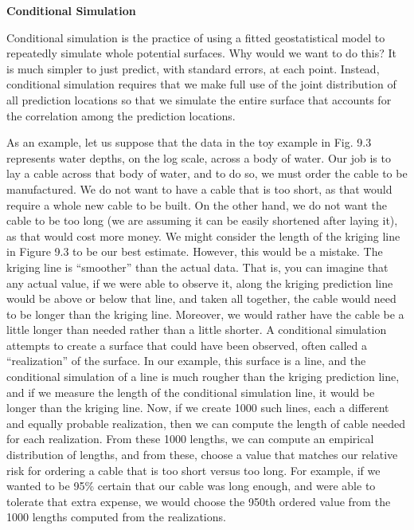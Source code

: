 \documentclass[12pt, titlepage]{article}
\begin{document}
\setcounter{equation}{0}
\renewcommand{\theequation}{R.\arabic{equation}}


%
%

{\large \flushleft \textbf{Conditional Simulation}}

\vspace{.3cm}

Conditional simulation is the practice of using a fitted geostatistical model to repeatedly simulate whole potential surfaces.  Why would we want to do this?  It is much simpler to just predict, with standard errors, at each point.  Instead, conditional simulation requires that we make full use of the joint distribution of all prediction locations so that we simulate the entire surface that accounts for the correlation among the prediction locations.

As an example, let us suppose that the data in the toy example in Fig. 9.3 represents water depths, on the log scale, across a body of water.  Our job is to lay a cable across that body of water, and to do so, we must order the cable to be manufactured.  We do not want to have a cable that is too short, as that would require a whole new cable to be built.  On the other hand, we do not want the cable to be too long (we are assuming it can be easily shortened after laying it), as that would cost more money.  We might consider the length of the kriging line in Figure 9.3 to be our best estimate.  However, this would be a mistake.  The kriging line is ``smoother'' than the actual data.  That is, you can imagine that any actual value, if we were able to observe it, along the kriging prediction line would be above or below that line, and taken all together, the cable would need to be longer than the kriging line. Moreover, we would rather have the cable be a little longer than needed rather than a little shorter.  A conditional simulation attempts to create a surface that could have been observed, often called a ``realization'' of the surface.  In our example, this surface is a line, and the conditional simulation of a line is much rougher than the kriging prediction line, and if we measure the length of the conditional simulation line, it would be longer than the kriging line.  Now, if we create 1000 such lines, each a different and equally probable realization, then we can compute the length of cable needed for each realization.  From these 1000 lengths, we can compute an empirical distribution of lengths, and from these, choose a value that matches our relative risk for ordering a cable that is too short versus too long.  For example, if we wanted to be 95\% certain that our cable was long enough, and were able to tolerate that extra expense, we would choose the 950th ordered value from the 1000 lengths computed from the realizations.
\end{document}
